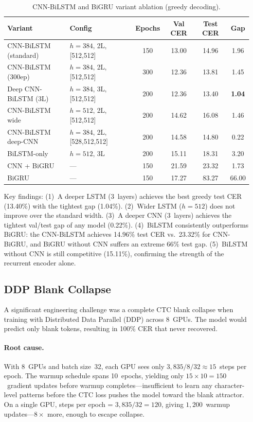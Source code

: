 \documentclass{article}
\begin{document}
\begin{table}[h]
\centering
\small
\caption{CNN-BiLSTM and BiGRU variant ablation (greedy decoding).}
\label{tab:bilstm-ablation}
\begin{tabular}{llcccc}
\toprule
\textbf{Variant} & \textbf{Config} & \textbf{Epochs} & \textbf{Val CER} & \textbf{Test CER} & \textbf{Gap} \\
\midrule
CNN-BiLSTM (standard) & $h{=}384$, 2L, [512,512] & 150 & 13.00 & 14.96 & 1.96 \\
CNN-BiLSTM (300ep) & $h{=}384$, 2L, [512,512] & 300 & 12.36 & 13.81 & 1.45 \\
Deep CNN-BiLSTM (3L) & $h{=}384$, 3L, [512,512] & 200 & 12.36 & 13.40 & \textbf{1.04} \\
CNN-BiLSTM wide & $h{=}512$, 2L, [512,512] & 200 & 14.62 & 16.08 & 1.46 \\
CNN-BiLSTM deep-CNN & $h{=}384$, 2L, [528,512,512] & 200 & 14.58 & 14.80 & 0.22 \\
BiLSTM-only & $h{=}512$, 3L & 200 & 15.11 & 18.31 & 3.20 \\
\midrule
CNN + BiGRU & --- & 150 & 21.59 & 23.32 & 1.73 \\
BiGRU & --- & 150 & 17.27 & 83.27 & 66.00 \\
\bottomrule
\end{tabular}
\end{table}

Key findings: (1)~A deeper LSTM (3~layers) achieves the best greedy test CER (13.40\%) with the tightest gap (1.04\%). (2)~Wider LSTM ($h{=}512$) does not improve over the standard width. (3)~A deeper CNN (3~layers) achieves the tightest val/test gap of any model (0.22\%). (4)~BiLSTM consistently outperforms BiGRU: the CNN-BiLSTM achieves 14.96\% test CER vs.\ 23.32\% for CNN-BiGRU, and BiGRU without CNN suffers an extreme 66\% test gap. (5)~BiLSTM without CNN is still competitive (15.11\%), confirming the strength of the recurrent encoder alone.


\subsection{DDP Blank Collapse}
\label{sec:ddp}

A significant engineering challenge was a complete CTC blank collapse when training with Distributed Data Parallel (DDP) across 8~GPUs. The model would predict only blank tokens, resulting in 100\% CER that never recovered.

\paragraph{Root cause.} With 8~GPUs and batch size~32, each GPU sees only $3{,}835 / 8 / 32 \approx 15$~steps per epoch. The warmup schedule spans 10~epochs, yielding only $15 \times 10 = 150$~gradient updates before warmup completes---insufficient to learn any character-level patterns before the CTC loss pushes the model toward the blank attractor. On a single GPU, steps per epoch = $3{,}835 / 32 = 120$, giving $1{,}200$~warmup updates---$8\times$ more, enough to escape collapse.
\end{document}
